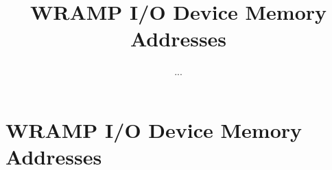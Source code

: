 \documentclass[a4paper]{book}
\title{WRAMP I/O Device Memory Addresses}
\author{...}
\begin{document}
\chapter*{WRAMP I/O Device Memory Addresses}

\end{document}
